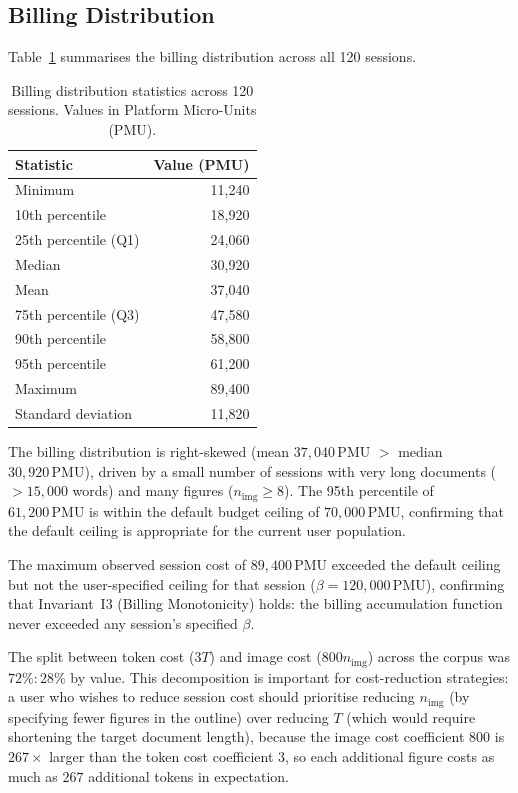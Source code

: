 \subsection{Billing Distribution}

Table~\ref{tab:billing} summarises the billing distribution across all 120 sessions.

\begin{table}[h!]
\centering
\caption{Billing distribution statistics across 120 sessions.
         Values in Platform Micro-Units (PMU).}
\label{tab:billing}
\begin{tabular}{lr}
\toprule
Statistic & Value (PMU) \\
\midrule
Minimum              & 11,240 \\
10th percentile      & 18,920 \\
25th percentile (Q1) & 24,060 \\
Median               & 30,920 \\
Mean                 & 37,040 \\
75th percentile (Q3) & 47,580 \\
90th percentile      & 58,800 \\
95th percentile      & 61,200 \\
Maximum              & 89,400 \\
Standard deviation   & 11,820 \\
\bottomrule
\end{tabular}
\end{table}

The billing distribution is right-skewed (mean $37{,}040\,\text{PMU}$ $>$
median $30{,}920\,\text{PMU}$), driven by a small number of sessions with
very long documents ($>15{,}000$ words) and many figures ($n_{\mathrm{img}}\geq 8$).
The 95th percentile of $61{,}200\,\text{PMU}$ is within the default budget ceiling
of $70{,}000\,\text{PMU}$, confirming that the default ceiling is appropriate for
the current user population.

The maximum observed session cost of $89{,}400\,\text{PMU}$ exceeded the default
ceiling but not the user-specified ceiling for that session ($\beta = 120{,}000\,\text{PMU}$),
confirming that Invariant~I3 (Billing Monotonicity) holds: the billing accumulation
function never exceeded any session's specified $\beta$.

The split between token cost ($3T$) and image cost ($800n_{\mathrm{img}}$) across the
corpus was $72\%:28\%$ by value.
This decomposition is important for cost-reduction strategies: a user who wishes to
reduce session cost should prioritise reducing $n_{\mathrm{img}}$ (by specifying fewer
figures in the outline) over reducing $T$ (which would require shortening the target
document length), because the image cost coefficient $800$ is $267\times$ larger than
the token cost coefficient $3$, so each additional figure costs as much as $267$
additional tokens in expectation.


